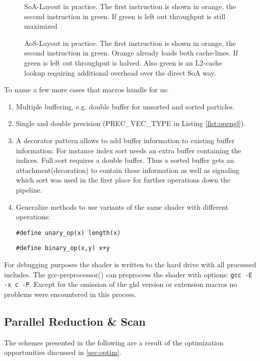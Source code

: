 \documentclass[m,times]{cgMA}
\begin{document}
\begin{figure}[htbp]
  \centering
  
  \caption{SoA-Layout in practice. The first instruction is shown in orange, the second instruction in green. If green is left out throughput is still maximized}
\label{fig:soa}
\end{figure}
\begin{figure}[htbp]  \centering
  
  \caption{AoS-Layout in practice. The first instruction is shown in orange, the second instruction in green. Orange already loads both cache-lines. If green is left out throughput is halved. Also green is an L2-cache lookup requiring additional overhead over the direct SoA way.}
\label{fig:aos}
\end{figure}

To name a few more cases that macros handle for us:
\begin{enumerate}
  \item Multiple buffering, e.g. double buffer for unsorted and sorted particles.
  \item Single and double precision (PREC\_VEC\_TYPE in Listing \ref{llst:opengl}).
  \item A decorator pattern allows to add buffer information to existing buffer information: For instance index sort needs an extra buffer containing the indices. Full sort requires a double buffer. Thus a sorted buffer gets an attachment(decoration) to contain these information as well as signaling which sort was used in the first place for further operations down the pipeline.
  \item Generalize methods to use variants of the same shader with different operations:

    \texttt{\#define unary\_op(x) length(x)}

    \texttt{\#define binary\_op(x,y) x+y}
\end{enumerate}
For debugging purposes the shader is written to the hard drive with all processed includes. The gcc-pre\-pro\-ces\-sor(\cite{GCC:PREP}) can preprocess the shader with options: \texttt{gcc -E -x c -P}. Except for the omission of the glsl version or extension macros no problems were encountered in this process.

\subsection{Parallel Reduction \& Scan} \label{sec:red_scan}
The schemes presented in the following are a result of the optimization opportunities discussed in \ref{sec:optim}.
\end{document}

